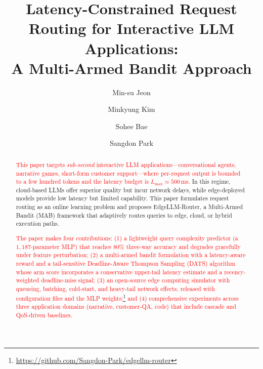 \documentclass[final,3p,twocolumn,authoryear]{elsarticle}
\newcommand{\rev}[1]{\textcolor{red}{#1}}
\newcommand{\system}{EdgeLLM-Router\xspace}
\theoremstyle{plain}
\theoremstyle{definition}
\begin{document}
\begin{frontmatter}

\title{Latency-Constrained Request Routing for Interactive LLM Applications: \\ A Multi-Armed Bandit Approach}

\author[inst1]{Min-su Jeon}
\author[inst1]{Minkyung Kim}
\author[inst1]{Sohee Bae}
\author[inst2]{Sangdon Park}



\begin{abstract}
\rev{This paper targets \emph{sub-second} interactive LLM applications---conversational agents, narrative games, short-form customer support---where per-request output is bounded to a few hundred tokens and the latency budget is $L_{\max} \approx 500$\,ms.}
In this regime, cloud-based LLMs offer superior quality but incur network delays, while edge-deployed models provide low latency but limited capability.
This paper formulates request routing as an online learning problem and proposes \system{}, a Multi-Armed Bandit (MAB) framework that adaptively routes queries to edge, cloud, or hybrid execution paths.

\rev{The paper makes four contributions:
(1) a lightweight query complexity predictor (a $1{,}187$-parameter MLP) that reaches $80\%$ three-way accuracy and degrades gracefully under feature perturbation;
(2) a multi-armed bandit formulation with a latency-aware reward and a tail-sensitive Deadline-Aware Thompson Sampling (DATS) algorithm whose arm score incorporates a conservative upper-tail latency estimate and a recency-weighted deadline-miss signal;
(3) an open-source edge computing simulator with queueing, batching, cold-start, and heavy-tail network effects, released with configuration files and the MLP weights;\footnote{\url{https://github.com/Sangdon-Park/edgellm-router}} and
(4) comprehensive experiments across three application domains (narrative, customer-QA, code) that include cascade and QoS-driven baselines.}


\end{abstract}
\end{frontmatter}
\end{document}
